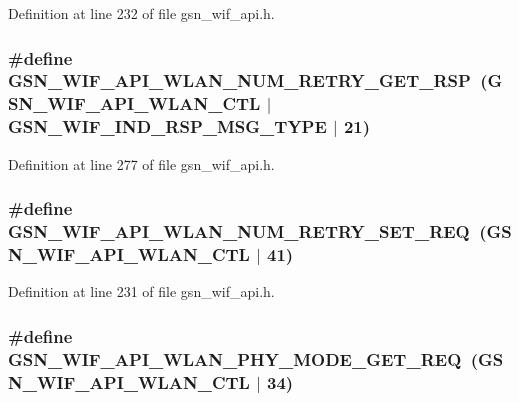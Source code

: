 Definition at line 232 of file gsn\_\-wif\_\-api.h.

\hypertarget{a00606_aa74bbfcfbed9f979db8cb8107c890572}{
\subsubsection[{GSN\_\-WIF\_\-API\_\-WLAN\_\-NUM\_\-RETRY\_\-GET\_\-RSP}]{\setlength{\rightskip}{0pt plus 5cm}\#define GSN\_\-WIF\_\-API\_\-WLAN\_\-NUM\_\-RETRY\_\-GET\_\-RSP~(GSN\_\-WIF\_\-API\_\-WLAN\_\-CTL $|$ GSN\_\-WIF\_\-IND\_\-RSP\_\-MSG\_\-TYPE $|$ 21)}}
\label{a00606_aa74bbfcfbed9f979db8cb8107c890572}


Definition at line 277 of file gsn\_\-wif\_\-api.h.

\hypertarget{a00606_a2b11495e7a42ebe57c2dbb52caa174be}{
\subsubsection[{GSN\_\-WIF\_\-API\_\-WLAN\_\-NUM\_\-RETRY\_\-SET\_\-REQ}]{\setlength{\rightskip}{0pt plus 5cm}\#define GSN\_\-WIF\_\-API\_\-WLAN\_\-NUM\_\-RETRY\_\-SET\_\-REQ~(GSN\_\-WIF\_\-API\_\-WLAN\_\-CTL $|$ 41)}}
\label{a00606_a2b11495e7a42ebe57c2dbb52caa174be}


Definition at line 231 of file gsn\_\-wif\_\-api.h.

\hypertarget{a00606_aba4abf8270641c5b5a406a2648ec1f35}{
\subsubsection[{GSN\_\-WIF\_\-API\_\-WLAN\_\-PHY\_\-MODE\_\-GET\_\-REQ}]{\setlength{\rightskip}{0pt plus 5cm}\#define GSN\_\-WIF\_\-API\_\-WLAN\_\-PHY\_\-MODE\_\-GET\_\-REQ~(GSN\_\-WIF\_\-API\_\-WLAN\_\-CTL $|$ 34)}}
\label{a00606_aba4abf8270641c5b5a406a2648ec1f35}


